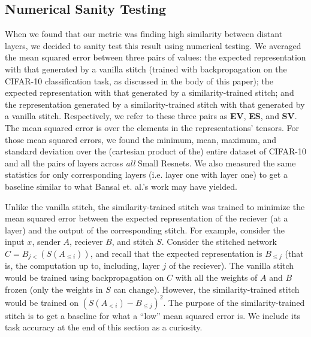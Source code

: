 \documentclass{article}
\begin{document}
\subsection*{Numerical Sanity Testing}
When we found that our metric was finding high similarity between distant layers, we decided to sanity test
this result using numerical testing. We averaged the mean squared error between three pairs of values:
the expected representation with that generated by a vanilla stitch (trained with backpropagation on the CIFAR-10
classification task, as discussed in the body of this paper); the expected representation with that generated 
by a similarity-trained stitch; and the representation generated by a similarity-trained stitch with that generated 
by a vanilla stitch. Respectively, we refer to these three pairs as \textbf{EV}, \textbf{ES}, and \textbf{SV}.
The mean squared error is over the elements in the representations' tensors. For those mean squared errors, we
found the minimum, mean, maximum, and standard deviation over the (cartesian product of the) entire dataset of
CIFAR-10 and all the pairs of layers across \textit{all} Small Resnets. We also measured the same statistics
for only corresponding layers (i.e. layer one with layer one) to get a baseline similar to what Bansal
et. al.'s work may have yielded.

Unlike the vanilla stitch, the similarity-trained stitch was trained to minimize the mean squared error between
the expected representation of the reciever (at a layer) and the output of the corresponding stitch. For example,
consider the input $x$, sender $A$, reciever $B$, and stitch $S$. Consider the stitched
network $C = B_{j<}(S(A_{\leq i}))$, and recall that the expected representation is $B_{\leq j}$ (that is, the computation
up to, including, layer $j$ of the reciever). The vanilla stitch would be trained using backpropagation on $C$ with
all the weights of $A$ and $B$ frozen (only the weights in $S$ can change). However, the similarity-trained stitch
would be trained on $(S(A_{<i}) - B_{\leq j})^2$. The purpose of the similarity-trained stitch is to get a baseline for
what a ``low'' mean squared error is. We include its task accuracy at the end of this section as a curiosity.
\end{document}
